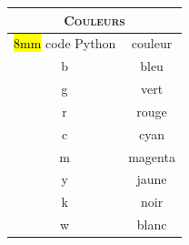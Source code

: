 \vspace{-5mm}
\hspace{1cm}\begin{minipage}[t][][b]{0.4\textwidth}
\begin{center}
\begin{tabular}[t]{|c|c|}
 \multicolumn{2}{c}{\textsc{Couleurs}} \\
\hline
\rowcolor{lightgray}\hl{8mm} code Python & couleur \\
\hline
b & bleu \\
\hline
g & vert \\
\hline
r & rouge \\
\hline
c & cyan \\
\hline
m & magenta \\
\hline
y & jaune \\
\hline
k & noir \\
\hline
w & blanc \\
\hline
\end{tabular}


\end{center}
\end{minipage}
